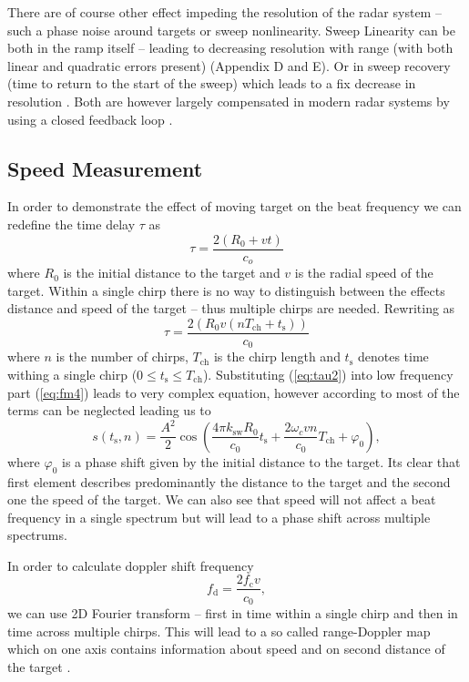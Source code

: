 There are of course other effect impeding the resolution of the radar system -- such a phase noise around targets or sweep nonlinearity.
Sweep Linearity can be both in the ramp itself -- leading to decreasing resolution with range (with both linear and quadratic errors present) \cite{graham2005} (Appendix D and E).
Or in sweep recovery (time to return to the start of the sweep) which leads to a fix decrease in resolution \cite{piper1995}.
Both are however largely compensated in modern radar systems by using a closed feedback loop \cite{graham2005}.


\subsection{Speed Measurement}

In order to demonstrate the effect of moving target on the beat frequency we can redefine the time delay $\tau$ as
\begin{equation}
	\tau = \frac{2(R_0+vt)}{c_o}
	\label{eq:tau}
\end{equation}
where $R_0$ is the initial distance to the target and $v$ is the radial speed of the target.
Within a single chirp there is no way to distinguish between the effects distance and speed of the target -- thus multiple chirps are needed.
Rewriting \label{eq:tau} as
\begin{equation}
	\tau = \frac{2(R_0 v(nT_\mathrm{ch} + t_\mathrm{s}))}{c_0}
	\label{eq:tau2}
\end{equation}
where $n$ is the number of chirps, $T_\mathrm{ch}$ is the chirp length and $t_\mathrm{s}$ denotes time withing  a single chirp ($0 \leq t_\mathrm{s} \leq T_\mathrm{ch}$).
Substituting (\ref{eq:tau2}) into low frequency part (\ref{eq:fm4}) leads to very complex equation, however according to \cite{suleymanov2016} most of the terms can be neglected leading us to
\begin{equation}
	s(t_\mathrm{s}, n) = \frac{A^2}{2} \cos\left(\frac{4\pi k_\mathrm{sw} R_0}{c_0} t_\mathrm{s} + \frac{2\omega_c v n}{c_0} T_\mathrm{ch} + \varphi_0 \right),
	\label{eq:fb2}
\end{equation}
where $\varphi_0$ is a phase shift given by the initial distance to the target.
Its clear that first element describes predominantly the distance to the target and the second one the speed of the target.
We can also see that speed will not affect a beat frequency in a single spectrum but will lead to a phase shift across multiple spectrums.

In order to calculate doppler shift frequency
\begin{equation}
	f_\mathrm{d} = \frac{2f_\mathrm{c}v}{c_0},
	\label{eq:doppler2}
\end{equation}
we can use 2D Fourier transform -- first in time within a single chirp and then in time across multiple chirps.
This will lead to a so called range-Doppler map which on one axis contains information about speed and on second distance of the target \cite{suleymanov2016}.

